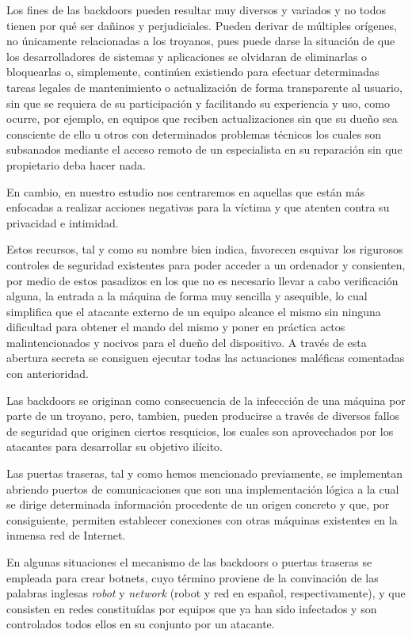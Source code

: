 		Los fines de las backdoors pueden resultar muy diversos y variados y no todos tienen por qué ser dañinos y perjudiciales. Pueden derivar de múltiples orígenes, no únicamente relacionadas a los troyanos, pues puede darse la situación de que los desarrolladores de sistemas y aplicaciones se olvidaran de eliminarlas o bloquearlas o, simplemente, continúen existiendo para efectuar determinadas tareas legales de mantenimiento o actualización de forma transparente al usuario, sin que se requiera de su participación y facilitando su experiencia y uso, como ocurre, por ejemplo, en equipos que reciben actualizaciones sin que su dueño sea consciente de ello u otros con determinados problemas técnicos los cuales son subsanados mediante el acceso remoto de un especialista en su reparación sin que propietario deba hacer nada.

		En cambio, en nuestro estudio nos centraremos en aquellas que están más enfocadas a realizar acciones negativas para la víctima y que atenten contra su privacidad e intimidad.

		Estos recursos, tal y como su nombre bien indica, favorecen esquivar los rigurosos controles de seguridad existentes para poder acceder a un ordenador y consienten, por medio de estos pasadizos en los que no es necesario llevar a cabo verificación alguna, la entrada a la máquina de forma muy sencilla y asequible, lo cual simplifica que el atacante externo de un equipo alcance el mismo sin ninguna dificultad para obtener el mando del mismo y poner en práctica actos malintencionados y nocivos para el dueño del dispositivo. A través de esta abertura secreta se consiguen ejecutar todas las actuaciones maléficas comentadas con anterioridad.

		Las backdoors se originan como consecuencia de la infeccción de una máquina por parte de un troyano, pero, tambien, pueden producirse a través de diversos fallos de seguridad que originen ciertos resquicios, los cuales son aprovechados por los atacantes para desarrollar su objetivo ilícito.

		Las puertas traseras, tal y como hemos mencionado previamente, se implementan abriendo puertos de comunicaciones que son una implementación lógica a la cual se dirige determinada información procedente de un origen concreto y que, por consiguiente, permiten establecer conexiones con otras máquinas existentes en la inmensa red de Internet.

		En algunas situaciones el mecanismo de las backdoors o puertas traseras se empleada para crear botnets, cuyo término proviene de la convinación de las palabras inglesas \textit{robot} y \textit{network} (robot y red en español, respectivamente), y que consisten en redes constituídas por equipos que ya han sido infectados y son controlados todos ellos en su conjunto por un atacante.

